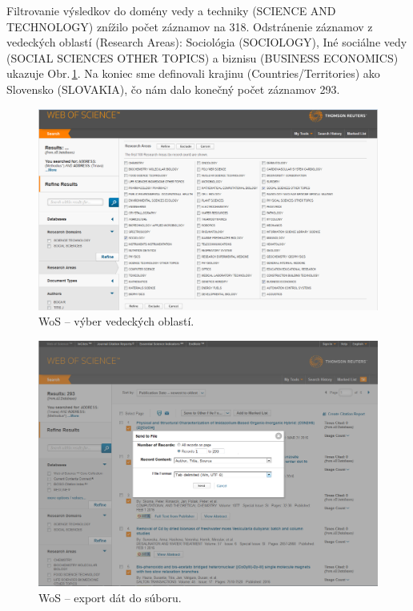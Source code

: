 Filtrovanie výsledkov do domény vedy a techniky (SCIENCE AND TECHNOLOGY) znížilo
počet záznamov na 318. Odstránenie záznamov z vedeckých oblastí (Research
Areas): Sociológia (SOCIOLOGY), Iné sociálne vedy (SOCIAL SCIENCES OTHER TOPICS)
a biznisu (BUSINESS ECONOMICS) ukazuje Obr.\,\ref{fig:wos.areaselection}. Na
koniec sme definovali krajinu (Countries/Territories) ako Slovensko (SLOVAKIA),
čo nám dalo konečný počet záznamov 293.

\begin{figure}
  \centering
  \includegraphics[width=\textwidth]{obr/wos04-cut.jpg}
  \caption{WoS -- výber vedeckých oblastí.}
  \label{fig:wos.areaselection}
\end{figure}

\begin{figure}
  \centering
  \includegraphics[width=\textwidth]{obr/wos06-cut.jpg}
  \caption{WoS -- export dát do súboru.}
  \label{fig:wos.export}
\end{figure}

